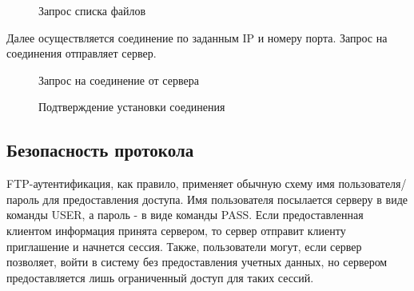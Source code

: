 \documentclass[a4paper, 14pt,russian]{article}
\begin{document}
	\newpage
	\begin{figure}[h!]
	\caption{Запрос списка файлов}
	\label{img:ftp_act1}
	\end{figure}
	
	
	Далее осуществляется соединение по заданным IP и номеру порта. Запрос на соединения отправляет сервер.
	\begin{figure}[h!]
		\caption{Запрос на соединение от сервера}
		\label{img:ftp_act1}
	\end{figure}
	
	\begin{figure}[h!]
		\caption{Подтверждение установки соединения}
		\label{img:ftp_act1}
	\end{figure}
	
	\newpage
	

	
\subsection{Безопасность протокола}
	FTP-аутентификация, как правило, применяет обычную схему имя пользователя/пароль для предоставления доступа. Имя пользователя посылается серверу в виде команды USER, а пароль - в виде команды PASS. Если предоставленная клиентом информация принята сервером, то сервер отправит клиенту приглашение и начнется сессия. Также, пользователи могут, если сервер позволяет, войти в систему без предоставления учетных данных, но сервером предоставляется лишь ограниченный доступ для таких сессий.
	
\end{document}
